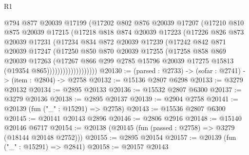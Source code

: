 \begin{lexlean}{R1}
\begin{coremodule}
                      @794
                      @877
                      @20039
                      @17199
                      (@17202
                        @802
                        @876
                        @20039
                        @17207
                        (@17210
                          @810
                          @875
                          @20039
                          @17215
                          (@17218
                            @818
                            @874
                            @20039
                            @17223
                            (@17226
                              @826
                              @873
                              @20039
                              @17231
                              (@17234
                                @834
                                @872
                                @20039
                                @17239
                                (@17242
                                  @842
                                  @871
                                  @20039
                                  @17247
                                  (@17250
                                    @850
                                    @870
                                    @20039
                                    @17255
                                    (@17258
                                      @858
                                      @869
                                      @20039
                                      @17263
                                      (@17267
                                        @866
                                        @299
                                        @2785
                                        @15796
                                        @20039
                                        @17275
                                        @15813
                                        (@19354 @865)))))))))))))))))))
@20130 := (parsed : @2733) -> (sofar : @2741) -> (item : @2804) -> @2758
@20132 := @15136 @2807 @6298
@20133 := @3279 @20132
@20134 := @2895 @20133
@20136 := @15532 @2807 @6300
@20137 := @3279 @20136
@20138 := @2895 @20137
@20139 := @2904 @2758
@20141 := @20139 (fun ("_" : @15291) => @2758)
@20143 := @15536 @2807 @6300
@20145 := @20141 @20143 @2896
@20146 := @2806 @2916
@20148 := @15140 @20146 @6717
@20154 := @20138 (@20145 (fun (passed : @2758) => @3279 (@18144 @20148 @2752)))
@20155 := @2895 @20154
@20157 := @20139 (fun ("_" : @15291) => @2841)
@20158 := @20157 @20143

\end{coremodule}
\end{lexlean}
